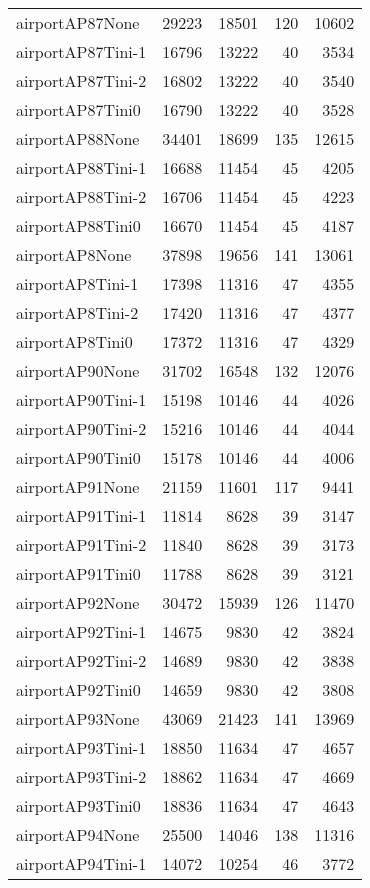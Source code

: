 \begin{longtable}{lrrrr}
airportAP87None & 29223 & 18501 & 120 & 10602 \\
airportAP87Tini-1 & 16796 & 13222 & 40 & 3534 \\
airportAP87Tini-2 & 16802 & 13222 & 40 & 3540 \\
airportAP87Tini0 & 16790 & 13222 & 40 & 3528 \\
airportAP88None & 34401 & 18699 & 135 & 12615 \\
airportAP88Tini-1 & 16688 & 11454 & 45 & 4205 \\
airportAP88Tini-2 & 16706 & 11454 & 45 & 4223 \\
airportAP88Tini0 & 16670 & 11454 & 45 & 4187 \\
airportAP8None & 37898 & 19656 & 141 & 13061 \\
airportAP8Tini-1 & 17398 & 11316 & 47 & 4355 \\
airportAP8Tini-2 & 17420 & 11316 & 47 & 4377 \\
airportAP8Tini0 & 17372 & 11316 & 47 & 4329 \\
airportAP90None & 31702 & 16548 & 132 & 12076 \\
airportAP90Tini-1 & 15198 & 10146 & 44 & 4026 \\
airportAP90Tini-2 & 15216 & 10146 & 44 & 4044 \\
airportAP90Tini0 & 15178 & 10146 & 44 & 4006 \\
airportAP91None & 21159 & 11601 & 117 & 9441 \\
airportAP91Tini-1 & 11814 & 8628 & 39 & 3147 \\
airportAP91Tini-2 & 11840 & 8628 & 39 & 3173 \\
airportAP91Tini0 & 11788 & 8628 & 39 & 3121 \\
airportAP92None & 30472 & 15939 & 126 & 11470 \\
airportAP92Tini-1 & 14675 & 9830 & 42 & 3824 \\
airportAP92Tini-2 & 14689 & 9830 & 42 & 3838 \\
airportAP92Tini0 & 14659 & 9830 & 42 & 3808 \\
airportAP93None & 43069 & 21423 & 141 & 13969 \\
airportAP93Tini-1 & 18850 & 11634 & 47 & 4657 \\
airportAP93Tini-2 & 18862 & 11634 & 47 & 4669 \\
airportAP93Tini0 & 18836 & 11634 & 47 & 4643 \\
airportAP94None & 25500 & 14046 & 138 & 11316 \\
airportAP94Tini-1 & 14072 & 10254 & 46 & 3772 \\

\end{longtable}
